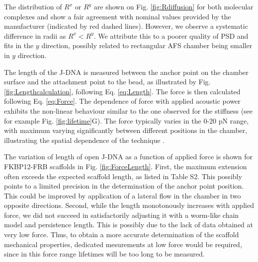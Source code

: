 \documentclass{biophys-new}
\begin{document}
The distribution of $R^x$ or $R^y$ are shown on Fig. \ref{fig:Rdiffusion} for both molecular complexes and show a fair agreement with nominal values provided by the manufacturer (indicated by red dashed lines). However, we observe a systematic difference in radii as $R^x < R^y$. We attribute this to a poorer quality of PSD and fits in the $y$ direction, possibly related to rectangular AFS chamber being smaller in $y$ direction.

The length of the J-DNA is measured between the anchor point on the chamber surface and the attachment point to the bead, as illustrated by Fig. \ref{fig:Lengthcalculation}, following Eq. \ref{eq:Length}. The force is then calculated following Eq. \ref{eq:Force}. The dependence of force with applied acoustic power exhibits the non-linear behaviour similar to the one observed for the stiffness (see for example Fig. \ref{fig:lifetime}G). The force typically varies in the 0-20 pN range, with maximum varying significantly between different positions in the chamber, illustrating the spatial dependence of the technique \cite{nguyen2021}.


The variation of length of open J-DNA as a function of applied force is shown for FKBP12-FRB scaffolds in Fig. \ref{fig:ForceLength}. First, the maximum extension often exceeds the expected scaffold length, as listed in Table S2. This possibly points to a limited precision in the determination of the anchor point position. This could be improved by application of a lateral flow in the chamber in two opposite directions. Second, while the length monotonously increases with applied force, we did not succeed in satisfactorily adjusting it with a worm-like chain model and persistence length. This is possibly due to the lack of data obtained at very low force. Thus, to obtain a more accurate determination of the scaffold mechanical properties, dedicated mesurements at low force would be required, since in this force range lifetimes will be too long to be measured.

\end{document}
